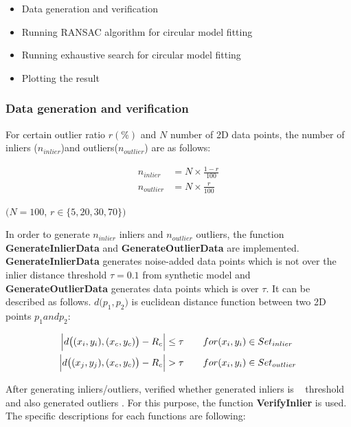 \documentclass[paper=a4, fontsize=11pt]{scrartcl} %
\numberwithin{equation}{section} %
\numberwithin{figure}{section} %
\numberwithin{table}{section} %
\newcommand{\funcname}[1]{\textbf{#1}}
\begin{document}
\begin{itemize}
\item Data generation and verification
\item Running RANSAC algorithm for circular model fitting
\item Running exhaustive search for circular model fitting
\item Plotting the result
\end{itemize}  

\subsubsection{Data generation and verification}

For certain outlier ratio $r  (\%)$ and $N$ number of 2D data points, the number of inliers ($n_{inlier}$)and outliers($n_{outlier}$) are as follows:

\begin{align*}
n_{inlier} &= N \times \frac{1 - r}{100}  \\
n_{outlier} &= N \times \frac{r}{100} 
\end{align*}

\begin{center}
$(N = 100$, $r \in \{5, 20, 30, 70\})$
\end{center}

In order to generate $n_{inlier}$ inliers and $n_{outlier}$ outliers, the function \funcname{GenerateInlierData} and \funcname{GenerateOutlierData} are implemented. \funcname{GenerateInlierData} generates noise-added data points which is not over the inlier distance threshold $\tau = 0.1$ from synthetic model and \funcname{GenerateOutlierData} generates data points which is over $\tau$. It can be described as follows. $d\big(p_{1}, p_{2}\big)$ is euclidean distance function between two 2D points $p_{1} and p_{2}$:

\begin{align*}
\abs{d \big( (x_{i}, y_{i}), (x_{c}, y_{c}) \big) - R_{c}} &\leq \tau  \qquad for (x_{i}, y_{i}) \in Set_{inlier} \\
\abs{d \big( (x_{j}, y_{j}), (x_{c}, y_{c}) \big) - R_{c}} &> \tau \qquad for (x_{i}, y_{i}) \in Set_{outlier} 
\end{align*}


After generating inliers/outliers, verified whether generated inliers is ~ threshold and also generated outliers . For this purpose, the function \funcname{VerifyInlier} is used. The specific descriptions for each functions are following:
\end{document}
